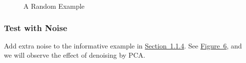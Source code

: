 \documentclass{article}
\begin{document}
\begin{figure}
	\centering
	\quad
	\caption{A Random Example}
	\label{fig-5}
\end{figure}

\subsubsection{Test with Noise}
Add extra noise to the informative example in \hyperref[sec-1.1.4]{Section~1.1.4}. See \hyperref[fig-6]{Figure~6}, and we will observe the effect of denoising by PCA.
\end{document}
